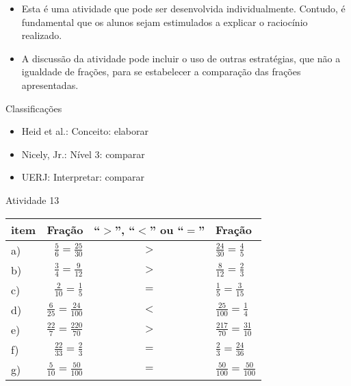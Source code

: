 \documentclass[oneside]{book}
\begin{document}
\begin{multicols}{2}
  
 
\begin{itemize} %
    \item       Esta é uma atividade que pode ser desenvolvida individualmente. 
Contudo, é fundamental que os alunos sejam estimulados a explicar o raciocínio 
realizado.
    \item       A discussão da atividade pode incluir o uso de outras 
estratégias, que não a igualdade de frações, para se estabelecer a comparação 
das frações apresentadas. 
\end{itemize} %
  
  
  Classificações  
\begin{itemize} %
    \item       Heid et al.: Conceito: elaborar
    \item       Nicely, Jr.: Nível 3: comparar
    \item       UERJ: Interpretar: comparar
\end{itemize} %

\begin{resposta*}{Atividade 13}
  
\noindent
    \begin{tabular}{lrcl}
      
       item &  Fração &  ``$>$'', ``$<$'' ou ``$=$'' &  Fração \\
      \hline 
       a) &  $\frac{5}{6} = \frac{25}{30}$ &   $>$  &  $\frac{24}{30} = 
\frac{4}{5}$ \\
     
       b) &  $\frac{3}{4} = \frac{9}{12}$ &   $>$  &  $\frac{8}{12} = 
\frac{2}{3}$ \\
     
       c) &  $\frac{2}{10} = \frac{1}{5}$ &   $=$  &  $\frac{1}{5} = 
\frac{3}{15}$ \\
     
       d) &  $\frac{6}{25} = \frac{24}{100}$ &   $<$  &  $\frac{25}{100} = 
\frac{1}{4}$ \\
     
       e) &  $\frac{22}{7} = \frac{220}{70}$ &   $>$  &  $\frac{217}{70} = 
\frac{31}{10}$ \\
     
       f) &  $\frac{22}{33} = \frac{2}{3}$ &   $=$  &  $\frac{2}{3} = 
\frac{24}{36}$ \\
     
       g) &  $\frac{5}{10} = \frac{50}{100}$ &   $=$  &  $\frac{50}{100} = 
\frac{50}{100}$ \\
     

\end{tabular}
\end{resposta*}
\end{multicols}
\end{document}
